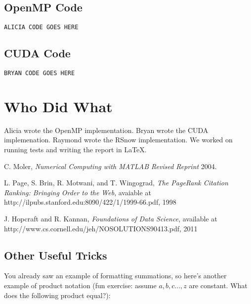 \documentclass[11pt,letterpaper]{article}
\begin{document}
\subsection{OpenMP Code}
\begin{lstlisting}[style=MyC++Style]
ALICIA CODE GOES HERE
\end{lstlisting}

\subsection{CUDA Code}
\begin{lstlisting}[style=MyC++Style]
BRYAN CODE GOES HERE
\end{lstlisting}

\section{Who Did What} \label{App:AppendixB}

Alicia wrote the OpenMP implementation. Bryan wrote the CUDA implemenation. Raymond wrote the RSnow implementation. We worked on running tests and writing the report in  \LaTeX.

\newpage

\begin{thebibliography}{1}

   C. Moler, {\em Numerical Computing with MATLAB Revised Reprint}  2004.

    L. Page, S. Brin, R. Motwani, and T. Wingograd, {\em The PageRank Citation Ranking: Bringing Order to the Web}, avaiable at http://ilpubs.stanford.edu:8090/422/1/1999-66.pdf,	1998

    J. Hopcraft and R. Kannan, {\em Foundations of Data Science}, available at http://www.cs.cornell.edu/jeh/NOSOLUTIONS90413.pdf, 2011

\end{thebibliography}

\iffalse
\subsection{Other Useful Tricks}
You already saw an example of formatting summations, so here's another example of product notation
(fun exercise: assume $a,b,c...,z$ are constant.  What does the following product equal?):
\end{document}
